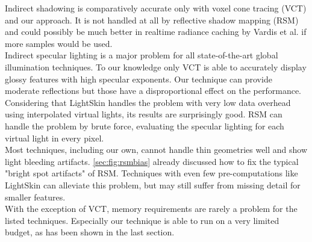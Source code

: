 \documentclass[thesis.tex]{subfiles}
\begin{document}
Indirect shadowing is comparatively accurate only with voxel cone tracing (VCT) \cite{bib:voxelconetracing} and our approach.
It is not handled at all by reflective shadow mapping (RSM) \cite{bib:reflectiveshadowmaps} and could possibly be much better in realtime radiance caching by Vardis et al. \cite{bib:radiancecachechromaticcompression} if more samples would be used.
\\
Indirect specular lighting is a major problem for all state-of-the-art global illumination techniques.
To our knowledge only VCT is able to accurately display glossy features with high specular exponents.
Our technique can provide moderate reflections but those have a disproportional effect on the performance.
Considering that LightSkin \cite{bib:LightskinPaper} handles the problem with very low data overhead using interpolated virtual lights, its results are surprisingly good.
RSM can handle the problem by brute force, evaluating the specular lighting for each virtual light in every pixel.
\\
Most techniques, including our own, cannot handle thin geometries well and show light bleeding artifacts.
\autoref{sec:fig:rsmbias} already discussed how to fix the typical "bright spot artifacts" of RSM.
Techniques with even few pre-computations like LightSkin can alleviate this problem, but may still suffer from missing detail for smaller features.
\\
With the exception of VCT, memory requirements are rarely a problem for the listed techniques.
Especially our technique is able to run on a very limited budget, as has been shown in the last section.
\end{document}
